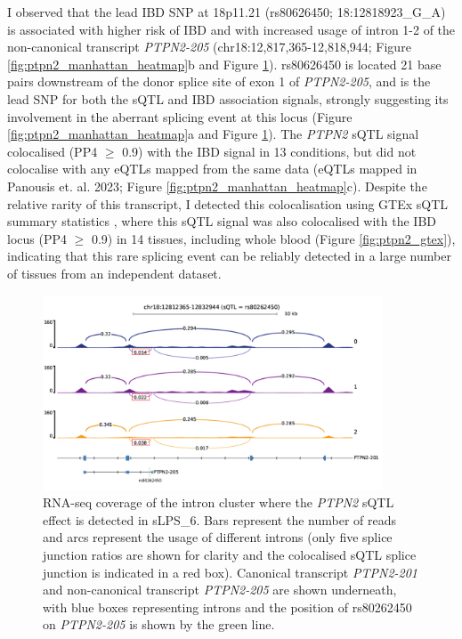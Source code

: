 I observed that the lead IBD SNP at 18p11.21 (rs80626450; 18:12818923\_G\_A) is associated with higher risk of IBD and with increased usage of intron 1-2 of the non-canonical transcript \textit{PTPN2-205} (chr18:12,817,365-12,818,944; Figure \ref{fig:ptpn2_manhattan_heatmap}b and  Figure \ref{fig:ptpn2_sashimi}). rs80626450 is located 21 base pairs downstream of the donor splice site of exon 1 of \textit{PTPN2-205}, and is the lead SNP for both the sQTL and IBD association signals, strongly suggesting its involvement in the aberrant splicing event at this locus (Figure \ref{fig:ptpn2_manhattan_heatmap}a and Figure \ref{fig:ptpn2_sashimi}). The \textit{PTPN2} sQTL signal colocalised (PP4 $\geq$ 0.9) with the IBD signal in 13 conditions, but did not colocalise with any eQTLs mapped from the same data (eQTLs mapped in Panousis et. al. 2023; Figure \ref{fig:ptpn2_manhattan_heatmap}c). Despite the relative rarity of this transcript, I detected this colocalisation using GTEx sQTL summary statistics \cite{The_GTEx_Consortium2020-gg}, where this sQTL signal was also colocalised with the IBD locus (PP4 $\geq$ 0.9) in 14 tissues, including whole blood (Figure \ref{fig:ptpn2_gtex}), indicating that this rare splicing event can be reliably detected in a large number of tissues from an independent dataset. \\ 

\begin{figure}[H]
  \centering
  \includegraphics[width=0.9\textwidth]{ptpn2_sashimi}
  \caption[\textit{PTPN2} RNA-seq coverage plot]{RNA-seq coverage of the intron cluster where the \textit{PTPN2} sQTL effect is detected in sLPS\_6. Bars represent the number of reads and arcs represent the usage of different introns (only five splice junction ratios are shown for clarity and the colocalised sQTL splice junction is indicated in a red box). Canonical transcript \textit{PTPN2-201} and non-canonical transcript \textit{PTPN2-205} are shown underneath, with blue boxes representing introns and the position of rs80262450 on \textit{PTPN2-205} is shown by the green line.}
  \label{fig:ptpn2_sashimi}   
\end{figure}


